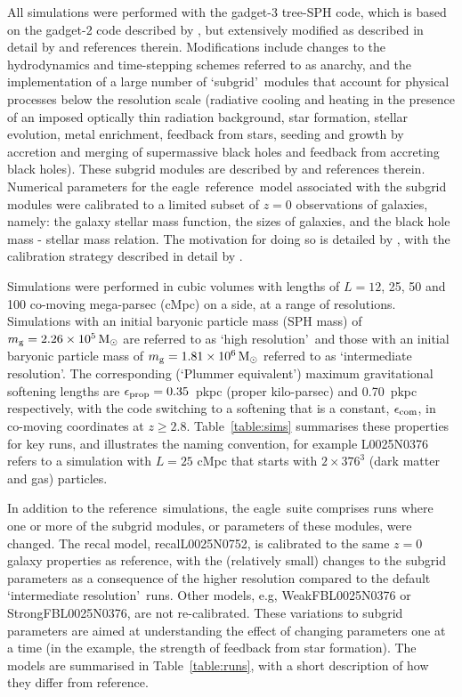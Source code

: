 \documentclass[10pt, a4paper]{article}
\newcommand{\eagle}{{\sc eagle}}
\newcommand{\REF}{{\sc reference}}
\begin{document}
All simulations were performed with the {\sc gadget-3} tree-SPH code, which is
based on the {\sc gadget-2} code described by \cite{springel2005}, but
extensively modified as described in detail by \cite{schaye2015} and references
therein.  Modifications include changes to the hydrodynamics and time-stepping
schemes referred to as {\sc anarchy}, and the implementation of a large number
of \lq subgrid\rq\ modules that account for physical processes below the
resolution scale (radiative cooling and heating in the presence of an imposed
optically thin radiation background, star formation, stellar evolution, metal
enrichment, feedback from stars, seeding and growth by accretion and merging of
supermassive black holes and feedback from accreting black holes). These
subgrid modules are described by \cite{schaye2015} and references therein.
Numerical parameters for the \eagle\ \REF\ model associated with the subgrid
modules were calibrated to a limited subset of $z=0$ observations of galaxies,
namely: the galaxy stellar mass function, the sizes of galaxies, and the black
hole mass - stellar mass relation. The motivation for doing so is detailed by
\cite{schaye2015}, with the calibration strategy described in detail by
\cite{crain2015}.
	
Simulations were performed in cubic volumes with lengths of $L=12$, 25, 50 and
100 co-moving mega-parsec (cMpc) on a side, at a range of resolutions.
Simulations with an initial baryonic particle mass (SPH mass) of $m_{\rm
g}=2.26\times 10^5\,{\rm M}_\odot$ are referred to as \lq high resolution\rq\
and those with an initial baryonic particle mass of $m_{\rm g}=1.81\times
10^6\,{\rm M}_\odot$ referred to as \lq intermediate resolution\rq. The
corresponding (\lq Plummer equivalent\rq) maximum gravitational softening
lengths are $\epsilon_{\rm prop}=0.35$~pkpc (proper kilo-parsec) and 0.70~pkpc
respectively, with the code switching to a softening that is a constant,
$\epsilon_{\rm com}$, in co-moving coordinates at $z \geq 2.8$.
Table~\ref{table:sims} summarises these properties for key runs, and
illustrates the naming convention, for example L0025N0376 refers to a simulation
with $L=25$ cMpc that starts with $2\times 376^3$ (dark matter and gas)
particles.

In addition to the \REF\ simulations, the \eagle\ suite comprises runs where
one or more of the subgrid modules, or parameters of these modules, were
changed.  The {\sc recal} model, {\sc recal}L0025N0752, is calibrated to the
same $z=0$ galaxy properties as \REF, with the (relatively small) changes to
the subgrid parameters as a consequence of the higher resolution compared to the
default \lq intermediate resolution\rq\ runs. Other models, e.g, {\sc
WeakFB}L0025N0376 or {\sc StrongFB}L0025N0376, are not re-calibrated. These
variations to subgrid parameters are aimed at understanding the effect of
changing parameters one at a time (in the example, the strength of feedback
from star formation). The models are summarised in Table~\ref{table:runs}, with
a short description of how they differ from \REF.
\end{document}

